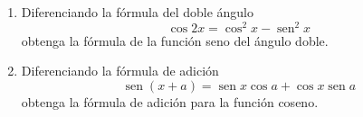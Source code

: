 \item \par
\begin{enumerate}
    \item[(a)] Diferenciando la fórmula del doble ángulo
    $$\cos 2x = \cos^2 x - \operatorname{sen}^2 x$$
    obtenga la fórmula de la función seno del ángulo doble.
    \item[(b)] Diferenciando la fórmula de adición
    $$\operatorname{sen}(x+a) = \operatorname{sen} x \cos a + \cos x \operatorname{sen} a$$
    obtenga la fórmula de adición para la función coseno.
\end{enumerate}
